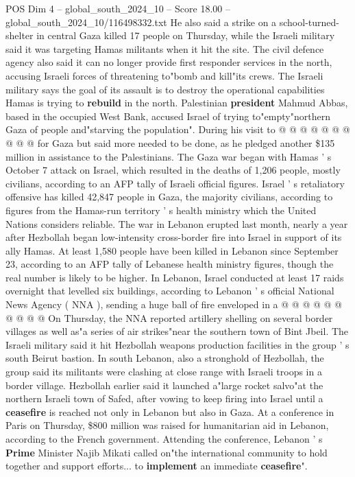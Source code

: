 \begin{textsample}{POS Dim 4 – global\_south\_2024\_10 – Score 18.00 – global\_south\_2024\_10/116498332.txt}
He also said a strike on a school-turned-shelter in central Gaza killed 17 people on Thursday, while the Israeli military said it was targeting Hamas militants when it hit the site.
The civil defence agency also said it can no longer provide first responder services in the north, accusing Israeli forces of threatening to"bomb and kill"its crews.
The Israeli military says the goal of its assault is to destroy the operational capabilities Hamas is trying to \textbf{rebuild} in the north.
Palestinian \textbf{president} Mahmud Abbas, based in the occupied West Bank, accused Israel of trying to"empty"northern Gaza of people and"starving the population".
During his visit to @ @ @ @ @ @ @ @ @ @ for Gaza but said more needed to be done, as he pledged another \$135 million in assistance to the Palestinians.
The Gaza war began with Hamas ' s October 7 attack on Israel, which resulted in the deaths of 1,206 people, mostly civilians, according to an AFP tally of Israeli official figures.
Israel ' s retaliatory offensive has killed 42,847 people in Gaza, the majority civilians, according to figures from the Hamas-run territory ' s health ministry which the United Nations considers reliable.
The war in Lebanon erupted last month, nearly a year after Hezbollah began low-intensity cross-border fire into Israel in support of its ally Hamas.
At least 1,580 people have been killed in Lebanon since September 23, according to an AFP tally of Lebanese health ministry figures, though the real number is likely to be higher.
In Lebanon, Israel conducted at least 17 raids overnight that levelled six buildings, according to Lebanon ' s official National News Agency ( NNA ), sending a huge ball of fire enveloped in a @ @ @ @ @ @ @ @ @ @ On Thursday, the NNA reported artillery shelling on several border villages as well as"a series of air strikes"near the southern town of Bint Jbeil.
The Israeli military said it hit Hezbollah weapons production facilities in the group ' s south Beirut bastion.
In south Lebanon, also a stronghold of Hezbollah, the group said its militants were clashing at close range with Israeli troops in a border village.
Hezbollah earlier said it launched a"large rocket salvo"at the northern Israeli town of Safed, after vowing to keep firing into Israel until a \textbf{ceasefire} is reached not only in Lebanon but also in Gaza.
At a conference in Paris on Thursday, \$800 million was raised for humanitarian aid in Lebanon, according to the French government.
Attending the conference, Lebanon ' s \textbf{Prime} Minister Najib Mikati called on"the international community to hold together and support efforts... to \textbf{implement} an immediate \textbf{ceasefire}".

\end{textsample}
